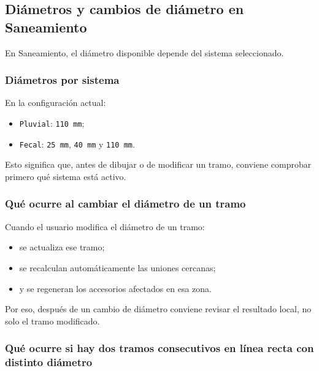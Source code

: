 \subsection{Diámetros y cambios de diámetro en Saneamiento}

En Saneamiento, el diámetro disponible depende del sistema seleccionado.

\subsubsection{Diámetros por sistema}

En la configuración actual:

\begin{itemize}
\item \texttt{Pluvial}: \texttt{110 mm};
\item \texttt{Fecal}: \texttt{25 mm}, \texttt{40 mm} y \texttt{110 mm}.
\end{itemize}

Esto significa que, antes de dibujar o de modificar un tramo, conviene comprobar primero qué sistema está activo.


\subsubsection{Qué ocurre al cambiar el diámetro de un tramo}

Cuando el usuario modifica el diámetro de un tramo:

\begin{itemize}
\item se actualiza ese tramo;
\item se recalculan automáticamente las uniones cercanas;
\item y se regeneran los accesorios afectados en esa zona.
\end{itemize}

Por eso, después de un cambio de diámetro conviene revisar el resultado local, no solo el tramo modificado.


\subsubsection{Qué ocurre si hay dos tramos consecutivos en línea recta con distinto diámetro}

